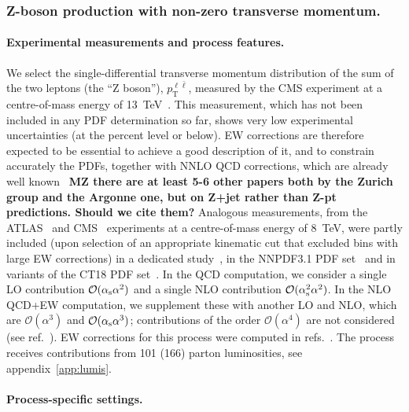 \subsubsection{Z-boson production with non-zero transverse momentum.}
\label{sec:Zpt}

\paragraph{Experimental measurements and process features.}
We select the single-differential transverse momentum distribution of the
sum of the two leptons (the \enquote{Z boson}), $p_\mathrm{T}^{\ell \bar{\ell}}$, measured by the CMS experiment at a
centre-of-mass energy of \SI{13}{\tera\electronvolt}~\cite{Sirunyan:2019bzr}.
This measurement, which has not been included in any PDF determination so far,
shows very low experimental uncertainties (at the percent level or below).
EW corrections are therefore expected to be essential to achieve a good
description of it, and to constrain accurately the PDFs, together with
NNLO QCD corrections, which are already well
known~\cite{Gehrmann-DeRidder:2017mvr,Bizon:2019zgf}
{\bf MZ there are at least 5-6 other papers both
  by the Zurich group and the Argonne one, but on Z+jet rather than
  Z-pt predictions. Should we cite them?}
Analogous measurements,
from the ATLAS~\cite{Aad:2015auj} and CMS~\cite{Khachatryan:2015oaa}
experiments at a centre-of-mass energy of \SI{8}{\tera\electronvolt},
were partly included (upon
selection of an appropriate kinematic cut that excluded bins with large EW
corrections) in a dedicated study~\cite{Boughezal:2017nla},
in the NNPDF3.1 PDF set~\cite{Ball:2017nwa} and in variants of
the CT18 PDF set~\cite{Hou:2019efy}. In the QCD computation, we consider a
single LO contribution $\mathcal{O}(\alpha_\mathrm{s}\alpha^2)$ and a single NLO
contribution $\mathcal{O}(\alpha_\mathrm{s}^2\alpha^2)$. In the NLO QCD+EW computation,
we supplement these with another LO and NLO, which are
$\mathcal{O}(\alpha^3)$ and $\mathcal{O}(\alpha_\mathrm{s}\alpha^3)$;
contributions of the order $\mathcal{O}(\alpha^4)$ are not considered (see ref.~\cite{Denner:2019zfp}).
EW corrections for this process were computed in
refs.~\cite{Kuhn:2005az,Denner:2011vu,Hollik:2015pja,Kallweit:2015dum}.
The process receives contributions from 101 (166) parton luminosities,
see appendix~\ref{app:lumis}.

\paragraph{Process-specific settings.}

